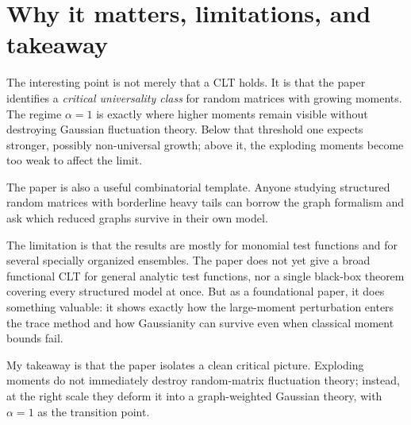 \documentclass[11pt]{article}
\begin{document}
\section*{Why it matters, limitations, and takeaway}
The interesting point is not merely that a CLT holds. It is that the paper identifies a \emph{critical universality class} for random matrices with growing moments. The regime $\alpha=1$ is exactly where higher moments remain visible without destroying Gaussian fluctuation theory. Below that threshold one expects stronger, possibly non-universal growth; above it, the exploding moments become too weak to affect the limit.

The paper is also a useful combinatorial template. Anyone studying structured random matrices with borderline heavy tails can borrow the graph formalism and ask which reduced graphs survive in their own model.

The limitation is that the results are mostly for monomial test functions and for several specially organized ensembles. The paper does not yet give a broad functional CLT for general analytic test functions, nor a single black-box theorem covering every structured model at once. But as a foundational paper, it does something valuable: it shows exactly how the large-moment perturbation enters the trace method and how Gaussianity can survive even when classical moment bounds fail.

My takeaway is that the paper isolates a clean critical picture. Exploding moments do not immediately destroy random-matrix fluctuation theory; instead, at the right scale they deform it into a graph-weighted Gaussian theory, with $\alpha=1$ as the transition point.
\end{document}
